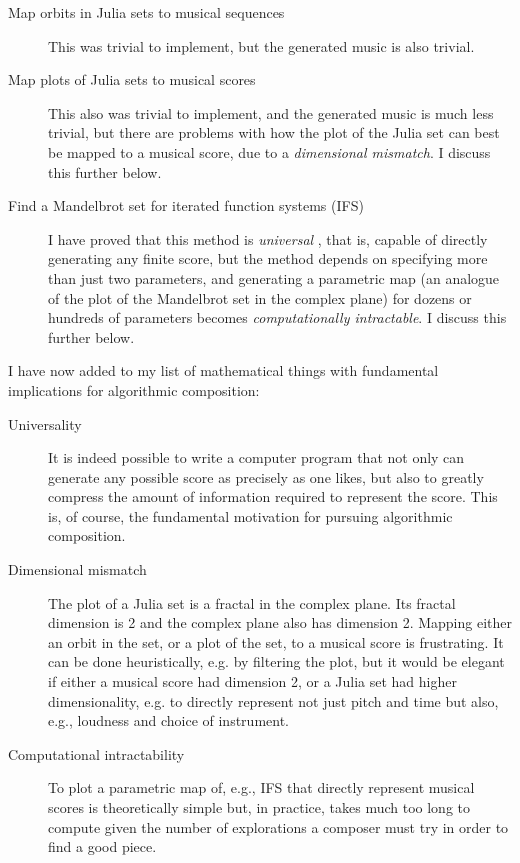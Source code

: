 \documentclass[11pt]{amsart}
\begin{document}
\begin{description}
\item[Map orbits in Julia sets to musical sequences] This was trivial to implement, but the generated music is also trivial.
\item[Map plots of Julia sets to musical scores] This also was trivial to implement, and the generated music is much less trivial, but there are problems with how the plot of the Julia set can best be mapped to a musical score, due to a \emph{dimensional mismatch}. I discuss this further below.
\item[Find a Mandelbrot set for iterated function systems (IFS)] I have proved that this method is \emph{universal} \cite{obsessed, gogins2023scoregraphs}, that is, capable of directly generating any finite score, but the method depends on specifying more than just two parameters, and generating a parametric map (an analogue of the plot of the Mandelbrot set in the complex plane) for dozens or hundreds of parameters becomes \emph{computationally intractable}. I discuss this further below.
\end{description}

I have now added to my list of mathematical things with fundamental implications for algorithmic composition:

\begin{description}
\item[Universality] It is indeed possible to write a computer program that not only can generate any possible score as precisely as one likes, but also to greatly compress the amount of information required to represent the score. This is, of course, the fundamental motivation for pursuing algorithmic composition.
\item[Dimensional mismatch] The plot of a Julia set is a fractal in the complex plane. Its fractal dimension is 2 and the complex plane also has dimension 2. Mapping either an orbit in the set, or a plot of the set, to a musical score is frustrating. It can be done heuristically, e.g. by filtering the plot, but it would be elegant if either a musical score had dimension 2, or a Julia set had higher dimensionality, e.g. to directly represent not just pitch and time but also, e.g., loudness and choice of instrument.
\item[Computational intractability] To plot a parametric map of, e.g., IFS that directly represent musical scores is theoretically simple but, in practice, takes much too long to compute given the number of explorations a composer must try in order to find a good piece.
\end{description}
\end{document}
